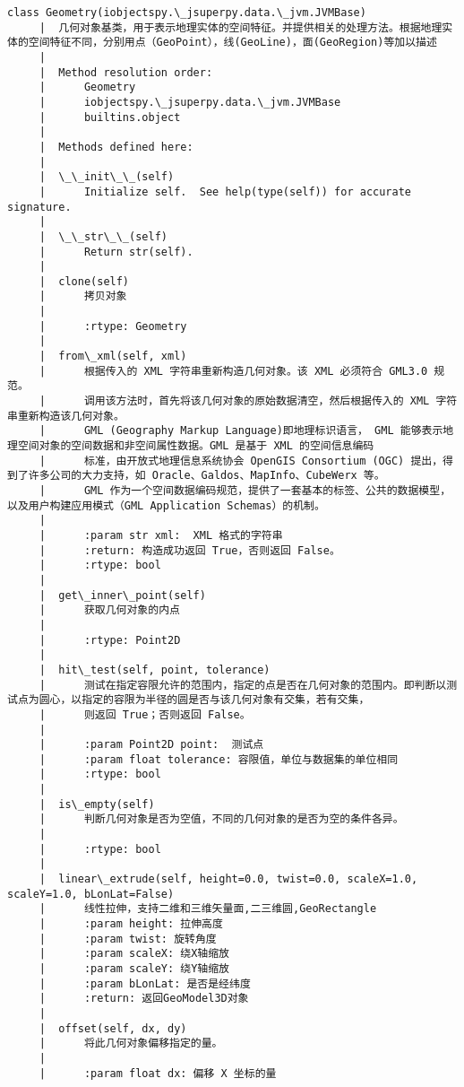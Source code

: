 \documentclass[11pt]{article}
\begin{document}
\begin{Verbatim}[commandchars=\\\{\}]
    class Geometry(iobjectspy.\_jsuperpy.data.\_jvm.JVMBase)
     |  几何对象基类，用于表示地理实体的空间特征。并提供相关的处理方法。根据地理实体的空间特征不同，分别用点（GeoPoint），线(GeoLine)，面(GeoRegion)等加以描述
     |  
     |  Method resolution order:
     |      Geometry
     |      iobjectspy.\_jsuperpy.data.\_jvm.JVMBase
     |      builtins.object
     |  
     |  Methods defined here:
     |  
     |  \_\_init\_\_(self)
     |      Initialize self.  See help(type(self)) for accurate signature.
     |  
     |  \_\_str\_\_(self)
     |      Return str(self).
     |  
     |  clone(self)
     |      拷贝对象
     |      
     |      :rtype: Geometry
     |  
     |  from\_xml(self, xml)
     |      根据传入的 XML 字符串重新构造几何对象。该 XML 必须符合 GML3.0 规范。
     |      调用该方法时，首先将该几何对象的原始数据清空，然后根据传入的 XML 字符串重新构造该几何对象。
     |      GML (Geography Markup Language)即地理标识语言， GML 能够表示地理空间对象的空间数据和非空间属性数据。GML 是基于 XML 的空间信息编码
     |      标准，由开放式地理信息系统协会 OpenGIS Consortium (OGC) 提出，得到了许多公司的大力支持，如 Oracle、Galdos、MapInfo、CubeWerx 等。
     |      GML 作为一个空间数据编码规范，提供了一套基本的标签、公共的数据模型，以及用户构建应用模式（GML Application Schemas）的机制。
     |      
     |      :param str xml:  XML 格式的字符串
     |      :return: 构造成功返回 True，否则返回 False。
     |      :rtype: bool
     |  
     |  get\_inner\_point(self)
     |      获取几何对象的内点
     |      
     |      :rtype: Point2D
     |  
     |  hit\_test(self, point, tolerance)
     |      测试在指定容限允许的范围内，指定的点是否在几何对象的范围内。即判断以测试点为圆心，以指定的容限为半径的圆是否与该几何对象有交集，若有交集，
     |      则返回 True；否则返回 False。
     |      
     |      :param Point2D point:  测试点
     |      :param float tolerance: 容限值，单位与数据集的单位相同
     |      :rtype: bool
     |  
     |  is\_empty(self)
     |      判断几何对象是否为空值，不同的几何对象的是否为空的条件各异。
     |      
     |      :rtype: bool
     |  
     |  linear\_extrude(self, height=0.0, twist=0.0, scaleX=1.0, scaleY=1.0, bLonLat=False)
     |      线性拉伸，支持二维和三维矢量面,二三维圆,GeoRectangle
     |      :param height: 拉伸高度
     |      :param twist: 旋转角度
     |      :param scaleX: 绕X轴缩放
     |      :param scaleY: 绕Y轴缩放
     |      :param bLonLat: 是否是经纬度
     |      :return: 返回GeoModel3D对象
     |  
     |  offset(self, dx, dy)
     |      将此几何对象偏移指定的量。
     |      
     |      :param float dx: 偏移 X 坐标的量

\end{Verbatim}
\end{document}

